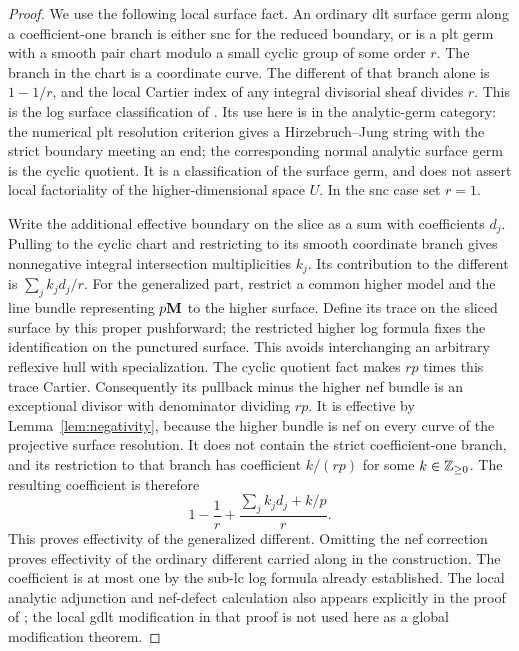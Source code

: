 \begin{proof}
We use the following local surface fact.  An ordinary dlt
surface germ along a coefficient-one branch is either snc for
the reduced boundary, or is a plt germ with a smooth pair
chart modulo a small cyclic group of some order $r$.  The
branch in the chart is a coordinate curve.  The different of
that branch alone is $1-1/r$, and the local Cartier index of
any integral divisorial sheaf divides $r$.  This is the log
surface classification of
\cite[Theorem~4.15(1),(3), pp.~119--120, and Proposition~4.18]{KM1998}.
Its use here
is in the analytic-germ category: the numerical plt resolution
criterion gives a Hirzebruch--Jung string with the strict
boundary meeting an end; the corresponding normal analytic
surface germ is the cyclic quotient.  It is a classification
of the surface germ, and does not assert local factoriality
of the higher-dimensional space $U$.  In the snc case set
$r=1$.

Write the additional effective boundary on the slice as a sum
with coefficients $d_j$.  Pulling to the cyclic chart and
restricting to its smooth coordinate branch gives nonnegative
integral intersection multiplicities $k_j$.  Its contribution
to the different is $\sum_j k_jd_j/r$.  For the generalized
part, restrict a common higher model and the line bundle
representing $p\mathbf M$ to the higher surface.  Define its trace on
the sliced surface by this proper pushforward; the restricted
higher log formula fixes the identification on the punctured
surface.  This avoids interchanging an arbitrary reflexive
hull with specialization.  The cyclic quotient fact makes
$rp$ times this trace Cartier.  Consequently its pullback
minus the higher nef bundle is an exceptional divisor with
denominator dividing $rp$.  It is effective by
Lemma~\ref{lem:negativity}, because the higher bundle is nef
on every curve of the projective surface resolution.  It
does not contain the strict coefficient-one branch, and its
restriction to that branch has coefficient $k/(rp)$ for
some $k\in\mathbb Z_{\geq0}$.  The resulting coefficient is therefore
\begin{equation}\label{eq:surface-generalized-different}
  1-\frac1r+\frac{\sum_jk_jd_j+k/p}{r}.
\end{equation}
This proves effectivity of the generalized different.
Omitting the nef correction proves effectivity of the ordinary
different carried along in the construction.  The coefficient
is at most one by the sub-lc log formula already established.
The local analytic adjunction and nef-defect calculation also
appears explicitly in the proof of
\cite[Lemma~3.1, pp.~5--6]{HXACC2023}; the local gdlt
modification in that proof is not used here as a global
modification theorem.


\end{proof}
